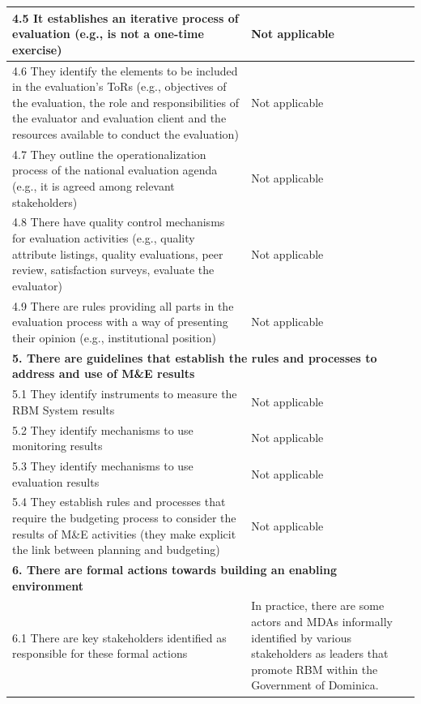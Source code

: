 \documentclass[
  10pt,
]{book}
\begin{document}
\begin{table}
\begin{tabular}[t]{l|l}
\hline
\hspace{1em}4.5 It establishes an iterative process of evaluation (e.g.,  is not a one-time exercise) & Not applicable\\
\hline
\hspace{1em}4.6 They identify the elements to be included in the evaluation's ToRs (e.g., objectives of the evaluation, the role and responsibilities of the evaluator and evaluation client and the resources available to conduct the evaluation) & Not applicable\\
\hline
\hspace{1em}4.7 They outline the operationalization process of the national evaluation agenda (e.g., it is agreed among relevant stakeholders) & Not applicable\\
\hline
\hspace{1em}4.8 There have quality control mechanisms for evaluation activities (e.g., quality attribute listings, quality evaluations, peer review, satisfaction surveys, evaluate the evaluator) & Not applicable\\
\hline
\hspace{1em}4.9 There are rules providing all parts in the evaluation process with a way of presenting their opinion (e.g., institutional position) & Not applicable\\
\hline
\multicolumn{2}{l}{\textbf{5. There are guidelines that establish the rules and processes to address and use of M\&E results}}\\
\hline
\hspace{1em}5.1 They identify instruments to measure the RBM System results & Not applicable\\
\hline
\hspace{1em}5.2 They identify mechanisms to use monitoring results & Not applicable\\
\hline
\hspace{1em}5.3 They identify mechanisms to use evaluation results & Not applicable\\
\hline
\hspace{1em}5.4 They establish rules and processes that require the budgeting process to consider the results of M\&E activities (they make explicit the link between planning and budgeting) & Not applicable\\
\hline
\multicolumn{2}{l}{\textbf{6. There are formal actions towards building an enabling environment}}\\
\hline
\hspace{1em}6.1 There are key stakeholders identified as responsible for these formal actions & In practice, there are some actors and MDAs informally identified by various stakeholders as leaders that promote RBM within the Government of Dominica.\\

\end{tabular}
\end{table}
\end{document}
